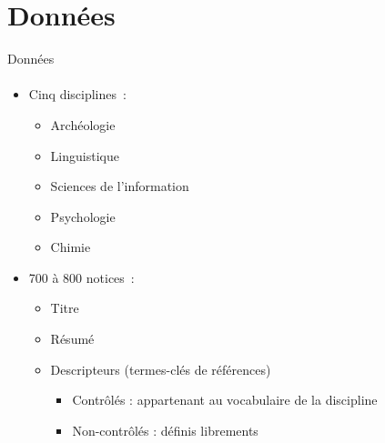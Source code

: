 \section{Données}
  \begin{frame}{Données}
    \framesubtitle{}

    \begin{itemize}
      \item{Cinq disciplines~:}
      \begin{itemize}
        \item{Archéologie}
        \item{Linguistique}
        \item{Sciences de l'information}
        \item{Psychologie}
        \item{Chimie}
      \end{itemize}
      \item<2->{700 à 800 notices~:}
      \begin{itemize}
        \item{Titre}
        \item{Résumé}
        \item{Descripteurs (termes-clés de références)}
        \begin{itemize}
          \item{Contrôlés : appartenant au vocabulaire de la discipline}
          \item{Non-contrôlés : définis librements}
        \end{itemize}
      \end{itemize}
    \end{itemize}
  \end{frame}


